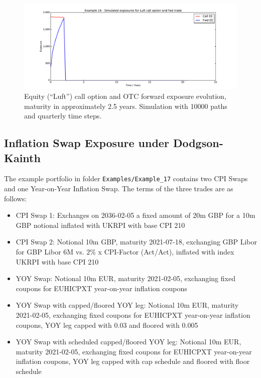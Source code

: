\documentclass[12pt, a4paper]{article}
\begin{document}
{\begin{figure}[h!]
	\begin{center}
		\includegraphics[scale=0.45]{mpl_eq_call.pdf}
	\end{center}
	\caption{Equity (``Luft'') call option and OTC forward exposure evolution, maturity in approximately 2.5 years. 
	Simulation with 
	10000 paths and quarterly time steps.}
	\label{fig_eq_call}
\end{figure}

\subsection{Inflation Swap Exposure under Dodgson-Kainth}%
\label{example:17}

The example portfolio in folder {\tt Examples/Example\_17} contains two CPI Swaps and one Year-on-Year Inflation Swap.
The terms of the three trades are as follows:

\begin{itemize}
\item CPI Swap 1: Exchanges on 2036-02-05 a fixed amount of 20m GBP for a 10m GBP notional inflated with UKRPI with base CPI 210
\item CPI Swap 2: Notional 10m GBP, maturity 2021-07-18, exchanging GBP Libor for GBP Libor 6M vs. $2\%$ x CPI-Factor (Act/Act), inflated with index UKRPI with base CPI 210
\item YOY Swap: Notional 10m EUR, maturity 2021-02-05, exchanging fixed coupons for EUHICPXT year-on-year inflation coupons
\item YOY Swap with capped/floored YOY leg: Notional 10m EUR, maturity 2021-02-05, exchanging fixed coupons for EUHICPXT year-on-year inflation coupons, YOY leg capped with 0.03 and floored with 0.005
\item YOY Swap with scheduled capped/floored YOY leg: Notional 10m EUR, maturity 2021-02-05, exchanging fixed coupons for EUHICPXT year-on-year inflation coupons, YOY leg capped with cap schedule and floored with floor schedule
\end{itemize}

}
\end{document}
